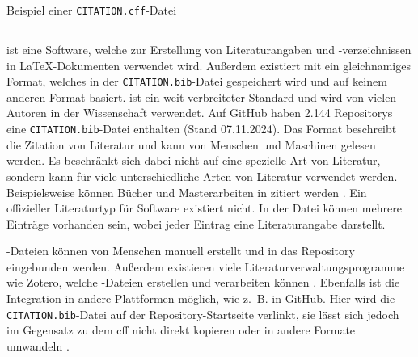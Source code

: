 \begin{listing}
    \inputminted{yaml}{../CITATION.cff}
    \caption{Beispiel einer \texttt{CITATION.cff}-Datei}
    \label{lst:cff_example}
\end{listing}

\subsection{}
\label{subsec:bibtex_format}
 ist eine Software, welche zur Erstellung von Literaturangaben und -verzeichnissen in \LaTeX{}-Dokumenten verwendet wird.
Außerdem existiert mit  ein gleichnamiges Format, welches in der \texttt{CITATION.bib}-Datei gespeichert wird und auf keinem anderen Format basiert.
 ist ein weit verbreiteter Standard und wird von vielen Autoren in der Wissenschaft verwendet.
Auf GitHub haben 2.144 Repositorys eine \texttt{CITATION.bib}-Datei enthalten (Stand 07.11.2024).
Das Format beschreibt die Zitation von Literatur und kann von Menschen und Maschinen gelesen werden.
Es beschränkt sich dabei nicht auf eine spezielle Art von Literatur, sondern kann für viele unterschiedliche Arten von Literatur verwendet werden.
Beispielsweise können Bücher und Masterarbeiten in  zitiert werden \autocite{patashnik_bibtexing_1988}.
Ein offizieller Literaturtyp für Software existiert nicht.
In der Datei können mehrere Einträge vorhanden sein, wobei jeder Eintrag eine Literaturangabe darstellt.

-Dateien können von Menschen manuell erstellt und in das Repository eingebunden werden.
Außerdem existieren viele Literaturverwaltungsprogramme wie Zotero, welche -Dateien erstellen und verarbeiten können \autocite{zotero_zotero_2024}.
Ebenfalls ist die Integration in andere Plattformen möglich, wie z. B. in GitHub.
Hier wird die \texttt{CITATION.bib}-Datei auf der Repository-Startseite verlinkt, sie lässt sich jedoch im Gegensatz zu dem \gls{cff} nicht direkt kopieren oder in andere Formate umwandeln \autocite{github_about_2024-1}.

